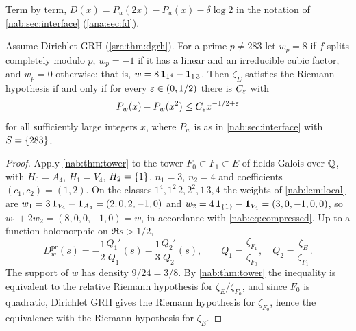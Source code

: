 Term by term, $D(x)=P_u(2x)-P_u(x)-\delta\log2$ in the notation of
\cref{nab:sec:interface} (\cref{ana:sec:fd}).

\begin{theorem}\label{grp:thm:s4-race}
Assume Dirichlet GRH (\cref{src:thm:dgrh}). For a prime $p\ne283$ let
$w_p=8$ if $f$ splits completely modulo $p$, $w_p=-1$ if it has a linear and
an irreducible cubic factor, and $w_p=0$ otherwise; that is,
$w=8\,\mathbf{1}_{1^4}-\mathbf{1}_{1\,3}$. Then $\zeta_E$ satisfies the Riemann
hypothesis if and only if for every $\varepsilon\in(0,1/2)$ there is $C_\varepsilon$ with
\[
 P_w(x)-P_w(x^2)\le C_\varepsilon x^{-1/2+\varepsilon}
\]
for all sufficiently large integers $x$, where $P_w$ is as in
\cref{nab:sec:interface} with $S=\{283\}$.
\end{theorem}

\begin{proof}
Apply \cref{nab:thm:tower} to the tower $F_0\subset F_1\subset E$ of fields
Galois over $\mathbb{Q}$, with $H_0=A_4$, $H_1=V_4$, $H_2=\{1\}$, $n_1=3$, $n_2=4$ and
coefficients $(c_1,c_2)=(1,2)$. On the classes $1^4,1^2\,2,2^2,1\,3,4$ the
weights of \cref{nab:lem:local} are $w_1=3\,\mathbf{1}_{V_4}-\mathbf{1}_{A_4}
=(2,0,2,-1,0)$ and $w_2=4\,\mathbf{1}_{\{1\}}-\mathbf{1}_{V_4}=(3,0,-1,0,0)$, so
$w_1+2w_2=(8,0,0,-1,0)=w$, in accordance with \eqref{nab:eq:compressed}. Up
to a function holomorphic on $\Re s>1/2$,
\[
 D^{\mathrm{pr}}_w(s)=-\frac12\frac{Q_1'}{Q_1}(s)-\frac13\frac{Q_2'}{Q_2}(s),\qquad
 Q_1=\frac{\zeta_{F_1}}{\zeta_{F_0}},\quad Q_2=\frac{\zeta_E}{\zeta_{F_1}} .
\]
The support of $w$ has density $9/24=3/8$. By \cref{nab:thm:tower} the
inequality is equivalent to the relative Riemann hypothesis for
$\zeta_E/\zeta_{F_0}$, and since $F_0$ is quadratic, Dirichlet GRH gives the
Riemann hypothesis for $\zeta_{F_0}$, hence the equivalence with the Riemann
hypothesis for $\zeta_E$.
\end{proof}

